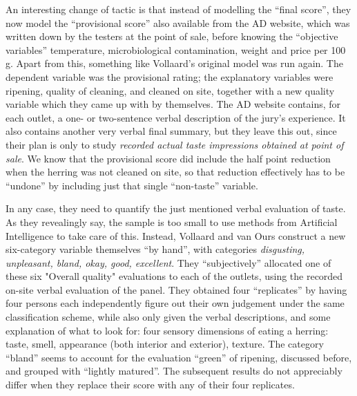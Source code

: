 \documentclass[alpha-refs]{wiley-article}
\begin{document}
An interesting change of tactic is that instead of modelling the ``final score'', they now model  the ``provisional score'' also available from the AD website, which was written down by the testers at the point of sale, before knowing the ``objective variables'' temperature, microbiological contamination, weight and price per 100 g. Apart from this, something like Vollaard's original model was run again. The dependent variable was the provisional rating; the explanatory variables were ripening, quality of cleaning, and cleaned on site, together with a new quality variable which they came up with by themselves. The AD website contains, for each outlet, a one- or two-sentence verbal description of the jury's experience. It also contains another very verbal final summary, but they leave this out, since their plan is only to study \emph{recorded actual taste impressions obtained at point of sale}. We know that the provisional score did include the half point reduction when the herring was not cleaned on site, so that reduction effectively has to be ``undone'' by including just that single ``non-taste'' variable.

In any case, they need to quantify the just mentioned verbal evaluation of taste. As they revealingly say, the sample is too small to use methods from Artificial Intelligence to take care of this.  Instead, Vollaard and van Ours construct a new six-category variable themselves ``by hand'', with categories \emph{disgusting, unpleasant, bland, okay, good, excellent}. They ``subjectively'' allocated one of these six "Overall quality" evaluations to each of the outlets, using the recorded on-site verbal evaluation of the panel. They obtained four ``replicates'' by having four persons each independently figure out their own judgement under the same classification scheme, while also only given the verbal descriptions, and some explanation of what to look for: four sensory dimensions of eating a herring: taste, smell, appearance (both interior and exterior), texture. The category ``bland'' seems to account for the evaluation ``green'' of ripening, discussed before, and grouped with ``lightly matured''. The subsequent results do not appreciably differ when they replace their score with any of their four replicates.
\end{document}
